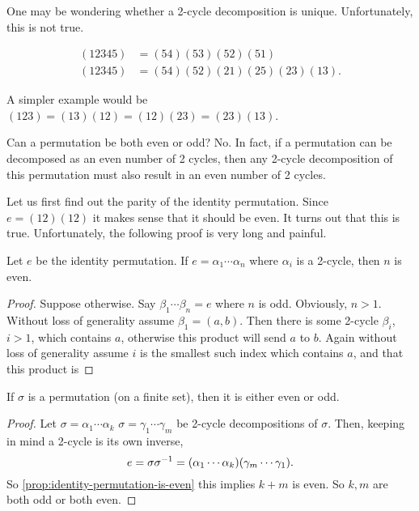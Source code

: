 \documentclass[./main.tex]{subfiles}
\begin{document}
One may be wondering whether a 2-cycle decomposition is unique. Unfortunately,
this is not true.  

\begin{example}
    \begin{align*}
        (12345) &= (54)(53)(52)(51) \\
        (12345) &= (54)(52)(21)(25)(23)(13).
    \end{align*}

    A simpler example would be $(123) = (13)(12) = (12)(23) = (23)(13)$.
\end{example}

Can a permutation be both even or odd? No. In fact, if a permutation can be
decomposed as an even number of 2 cycles, then any 2-cycle decomposition of this
permutation must also result in an even number of 2 cycles. 

Let us first find out the parity of the identity permutation. Since $e =
(12)(12)$ it makes sense that it should be even. It turns out that this is true.
Unfortunately, the following proof is very long and painful.
\begin{proposition}
\label{prop:identity-permutation-is-even}
    Let $e$ be the identity permutation. If $e = \alpha_1 \cdots \alpha_n$ where
    $\alpha_i$ is a 2-cycle, then $n$ is even.
\end{proposition}
\begin{proof}
    Suppose otherwise. Say $\beta_1 \cdots \beta_n = e$ where $n$ is odd.
    Obviously, $n > 1$. Without loss of generality assume $\beta_1 = (a,b)$.
    Then there is some 2-cycle $\beta_i$, $i > 1$, which contains $a$, otherwise
    this product will send $a$ to $b$. Again without loss of generality assume
    $i$ is the smallest such index which contains $a$, and that this product is 
\end{proof}

\begin{theorem}
    If $\sigma$ is a permutation (on a finite set), then it is either even or odd.
\end{theorem}
\begin{proof}
    Let $\sigma = \alpha_1 \cdots \alpha_k$ $\sigma = \gamma_1 \cdots \gamma_m$
    be 2-cycle decompositions of $\sigma$. Then, keeping in mind a 2-cycle is
    its own inverse,
    \[
        e = \sigma \sigma\inv = \paren{\alpha_1 \cdots \alpha_k} \paren{\gamma_m \cdots \gamma_1}.
    \]
    So \cref{prop:identity-permutation-is-even} this implies $k+m$ is even. So
    $k,m$ are both odd or both even.
\end{proof}
\end{document}
